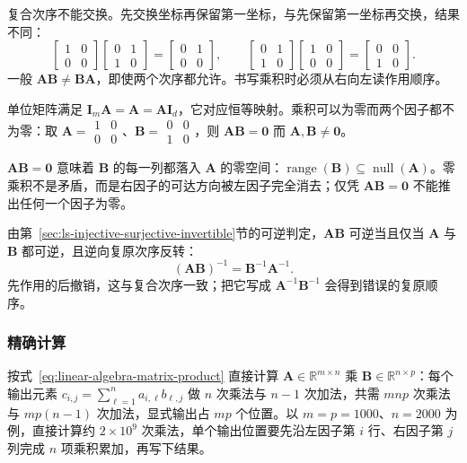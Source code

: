 复合次序不能交换。先交换坐标再保留第一坐标，与先保留第一坐标再交换，结果不同：
\[
 \begin{bmatrix}1&0\\0&0\end{bmatrix}
 \begin{bmatrix}0&1\\1&0\end{bmatrix}
 =
 \begin{bmatrix}0&1\\0&0\end{bmatrix},\qquad
 \begin{bmatrix}0&1\\1&0\end{bmatrix}
 \begin{bmatrix}1&0\\0&0\end{bmatrix}
 =
 \begin{bmatrix}0&0\\1&0\end{bmatrix}.
\]
一般 $\bm A\bm B\neq\bm B\bm A$，即使两个次序都允许。书写乘积时必须从右向左读作用顺序。

单位矩阵满足 $\bm I_m\bm A=\bm A=\bm A\bm I_d$，它对应恒等映射。乘积可以为零而两个因子都不为零：取 $\bm A=\begin{smallmatrix}1&0\\0&0\end{smallmatrix}$、$\bm B=\begin{smallmatrix}0&0\\1&0\end{smallmatrix}$，则 $\bm A\bm B=\bm0$ 而 $\bm A,\bm B\neq\bm0$。

$\bm A\bm B=\bm0$ 意味着 $\bm B$ 的每一列都落入 $\bm A$ 的零空间：$\operatorname{range}(\bm B)\subseteq\operatorname{null}(\bm A)$。零乘积不是矛盾，而是右因子的可达方向被左因子完全消去；仅凭 $\bm A\bm B=\bm0$ 不能推出任何一个因子为零。

由第~\ref{sec:ls-injective-surjective-invertible}节的可逆判定，$\bm A\bm B$ 可逆当且仅当 $\bm A$ 与 $\bm B$ 都可逆，且逆向复原次序反转：
\[
 (\bm A\bm B)^{-1}=\bm B^{-1}\bm A^{-1}.
\]
先作用的后撤销，这与复合次序一致；把它写成 $\bm A^{-1}\bm B^{-1}$ 会得到错误的复原顺序。

\subsubsection{精确计算}

按式~\eqref{eq:linear-algebra-matrix-product} 直接计算 $\bm A\in\mathbb R^{m\times n}$ 乘 $\bm B\in\mathbb R^{n\times p}$：每个输出元素 $c_{i,j}=\sum_{\ell=1}^n a_{i,\ell}b_{\ell,j}$ 做 $n$ 次乘法与 $n-1$ 次加法，共需 $mnp$ 次乘法与 $mp(n-1)$ 次加法，显式输出占 $mp$ 个位置。以 $m=p=1000$、$n=2000$ 为例，直接计算约 $2\times10^9$ 次乘法，单个输出位置要先沿左因子第 $i$ 行、右因子第 $j$ 列完成 $n$ 项乘积累加，再写下结果。

